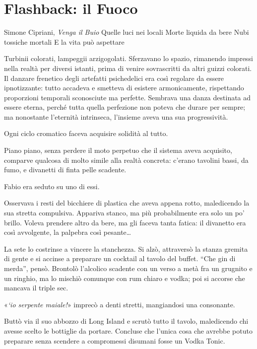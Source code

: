 \chapter{Flashback: il Fuoco}

\begin{chapquote}{Simone Cipriani, \textit{Venga il Buio}}
	Quelle luci nei locali\newline
	Morte liquida da bere\newline
	Nubi tossiche mortali\newline
	E la vita può aspettare
\end{chapquote}

Turbinii colorati, lampeggii arzigogolati. Sferzavano lo spazio, rimanendo impressi nella realtà per diversi istanti, prima di venire sovrascritti da altri guizzi colorati. Il danzare frenetico degli artefatti psichedelici era così regolare da essere ipnotizzante: tutto accadeva e smetteva di esistere armonicamente, rispettando proporzioni temporali sconosciute ma perfette. Sembrava una danza destinata ad essere eterna, perché tutta quella perfezione non poteva che durare per sempre; ma nonostante l'eternità intrinseca, l'insieme aveva una sua progressività.

Ogni ciclo cromatico faceva acquisire solidità al tutto.

Piano piano, senza perdere il moto perpetuo che il sistema aveva acquisito, comparve qualcosa di molto simile alla realtà concreta: c'erano tavolini bassi, da fumo, e divanetti di finta pelle scadente.

Fabio era seduto su uno di essi.

Osservava i resti del bicchiere di plastica che aveva appena rotto, maledicendo la sua stretta compulsiva. Appariva stanco, ma più probabilmente era solo un po' brillo. Voleva prendere altro da bere, ma gli faceva tanta fatica: il divanetto era così avvolgente, la palpebra così pesante\ldots{}

La sete lo costrinse a vincere la stanchezza. Si alzò, attraversò la stanza gremita di gente e si accinse a preparare un cocktail al tavolo del buffet. ``Che gin di merda'', pensò. Brontolò l'alcolico scadente con un verso a metà fra un grugnito e un ringhio, ma lo mischiò comunque con rum chiaro e vodka; poi si accorse che mancava il triple sec.

«\emph{`io serpente maiale!}» imprecò a denti stretti, mangiandosi una consonante.

Buttò via il suo abbozzo di Long Island e scrutò tutto il tavolo, maledicendo chi avesse scelto le bottiglie da portare. Concluse che l'unica cosa che avrebbe potuto preparare senza scendere a compromessi disumani fosse un Vodka Tonic.


